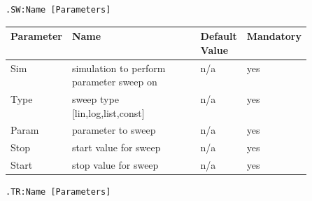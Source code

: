 

\begin{verbatim}
.SW:Name [Parameters]
\end{verbatim}


\begin{tabular}{|l|p{0.5\linewidth}|l|l|}
\hline
Parameter & Name & Default Value & Mandatory \\
\hline
Sim & simulation to perform parameter sweep on & n/a & yes \\
Type & sweep type [lin,log,list,const] & n/a & yes \\
Param & parameter to sweep & n/a & yes \\
Stop & start value for sweep & n/a & yes \\
Start & stop value for sweep & n/a & yes \\
\hline
\end{tabular}





\begin{verbatim}
.TR:Name [Parameters]
\end{verbatim}


